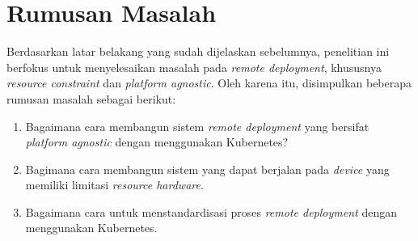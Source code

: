 \section{Rumusan Masalah}

Berdasarkan latar belakang yang sudah dijelaskan sebelumnya, penelitian ini berfokus untuk menyelesaikan masalah pada \textit{remote deployment}, khususnya \textit{resource constraint} dan \textit{platform agnostic}. Oleh karena itu, disimpulkan beberapa rumusan masalah sebagai berikut:

\begin{enumerate}
  \item Bagaimana cara membangun sistem \textit{remote deployment} yang bersifat \textit{platform agnostic} dengan menggunakan Kubernetes?
  \item Bagimana cara membangun sistem yang dapat berjalan pada \textit{device} yang memiliki limitasi \textit{resource hardware}.
  \item Bagaimana cara untuk menstandardisasi proses \textit{remote deployment} dengan menggunakan Kubernetes.
\end{enumerate}